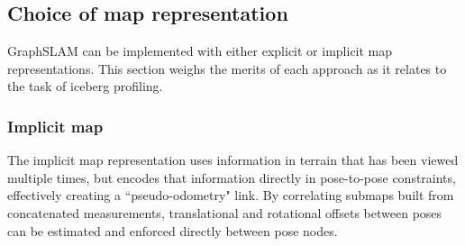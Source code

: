 
\subsection{Choice of map representation}

GraphSLAM can be implemented with either explicit or implicit map representations. This section weighs the merits of each approach as it relates to the task of iceberg profiling.

\subsubsection{Implicit map}
The implicit map representation uses information in terrain that has been viewed multiple times, but encodes that information directly in pose-to-pose constraints, effectively creating a ``pseudo-odometry" link. By correlating submaps built from concatenated measurements, translational and rotational offsets between poses can be estimated and enforced directly between pose nodes. 

